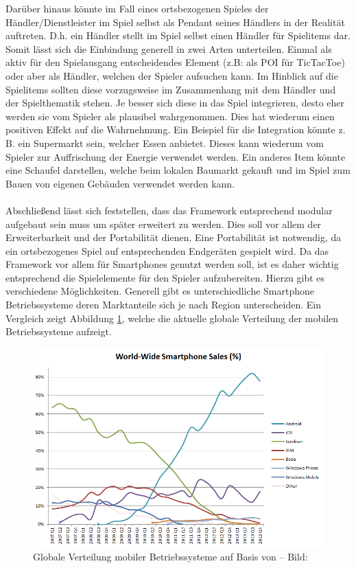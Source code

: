 Darüber hinaus könnte im Fall eines ortsbezogenen Spieles der Händler/Dienstleister im Spiel selbst als Pendant seines Händlers in der Realität auftreten. D.h. ein Händler stellt im Spiel selbst einen Händler für Spielitems dar.
Somit lässt sich die Einbindung generell in zwei Arten unterteilen. Einmal als aktiv für den Spielausgang entscheidendes Element (z.B: als POI für TicTacToe) oder aber als Händler, welchen der Spieler aufsuchen kann.
Im Hinblick auf die Spielitems sollten diese vorzugsweise im Zusammenhang mit dem Händler und der Spielthematik stehen. Je besser sich diese in das Spiel integrieren, desto eher werden sie vom Spieler als plausibel wahrgenommen. Dies hat wiederum einen positiven Effekt auf die Wahrnehmung.
Ein Beispiel für die Integration könnte z.\,B. ein Supermarkt sein, welcher Essen anbietet. Dieses kann wiederum vom Spieler zur Auffrischung der Energie verwendet werden. Ein anderes Item könnte eine Schaufel darstellen, welche beim lokalen Baumarkt gekauft und im Spiel zum Bauen von eigenen Gebäuden verwendet werden kann.
\\\\
Abschließend lässt sich feststellen, dass das Framework entsprechend modular aufgebaut sein muss um später erweitert zu werden. Dies soll vor allem der Erweiterbarkeit und der Portabilität dienen. Eine Portabilität ist notwendig, da ein ortsbezogenes Spiel auf entsprechenden Endgeräten gespielt wird. Da das Framework vor allem  für Smartphones genutzt werden soll, ist es daher wichtig entsprechend die Spielelemente für den Spieler aufzubereiten. Hierzu gibt es verschiedene Möglichkeiten.
Generell gibt es unterschiedliche Smartphone Betriebssysteme deren Marktanteile sich je nach Region unterscheiden.
Ein Vergleich zeigt Abbildung \ref{img:ch4_img02_marketshare}, welche die aktuelle globale Verteilung der mobilen Betriebssysteme aufzeigt.

\begin{figure}[H]
\begin{center}
\includegraphics[width=140mm]{images/ch4_img02_marketshare.png}
\caption{Globale Verteilung mobiler Betriebssysteme auf Basis von \textcite{Gartner.2013} -- Bild: \cite{Wikipedia.2014}}
\label{img:ch4_img02_marketshare}
\end{center}
\end{figure}

